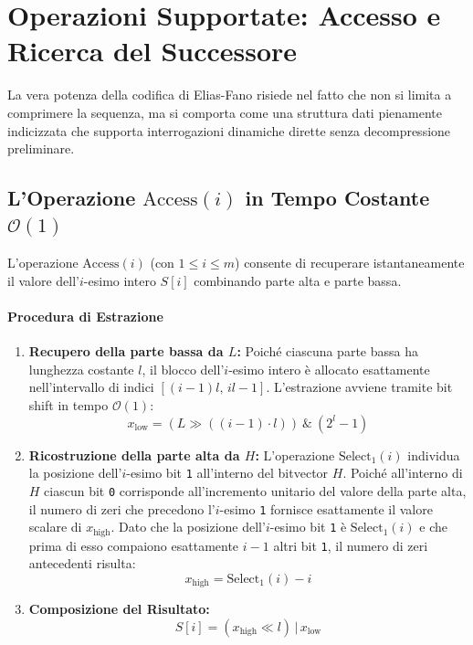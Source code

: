 \FloatBarrier
\section{Operazioni Supportate: Accesso e Ricerca del Successore}
\label{sec:operazioni-elias-fano}

La vera potenza della codifica di Elias-Fano risiede nel fatto che non si limita a comprimere la sequenza, ma si comporta come una struttura dati pienamente indicizzata che supporta interrogazioni dinamiche dirette senza decompressione preliminare.

\FloatBarrier
\subsection{L'Operazione $\text{Access}(i)$ in Tempo Costante $\mathcal{O}(1)$}
\label{subsec:operazione-access}

L'operazione $\text{Access}(i)$ (con $1 \le i \le m$) consente di recuperare istantaneamente il valore dell'$i$-esimo intero $S[i]$ combinando parte alta e parte bassa.

\paragraph{Procedura di Estrazione}
\begin{enumerate}
  \item \textbf{Recupero della parte bassa da $L$:}
  Poich\'e ciascuna parte bassa ha lunghezza costante $l$, il blocco dell'$i$-esimo intero \`e allocato esattamente nell'intervallo di indici $[(i-1)l, \, il - 1]$. L'estrazione avviene tramite bit shift in tempo $\mathcal{O}(1)$:
  \begin{equation}
    x_{\text{low}} = (L \gg ((i - 1) \cdot l)) \ \& \ (2^l - 1)
  \end{equation}
  \item \textbf{Ricostruzione della parte alta da $H$:}
  L'operazione $\text{Select}_1(i)$ individua la posizione dell'$i$-esimo bit \texttt{1} all'interno del bitvector $H$.
  Poich\'e all'interno di $H$ ciascun bit \texttt{0} corrisponde all'incremento unitario del valore della parte alta, il numero di zeri che precedono l'$i$-esimo \texttt{1} fornisce esattamente il valore scalare di $x_{\text{high}}$.
  Dato che la posizione dell'$i$-esimo bit \texttt{1} \`e $\text{Select}_1(i)$ e che prima di esso compaiono esattamente $i - 1$ altri bit \texttt{1}, il numero di zeri antecedenti risulta:
  \begin{equation}
    x_{\text{high}} = \text{Select}_1(i) - i
  \end{equation}
  \item \textbf{Composizione del Risultato:}
  \begin{equation}
    S[i] = (x_{\text{high}} \ll l) \,|\, x_{\text{low}}
  \end{equation}
\end{enumerate}

